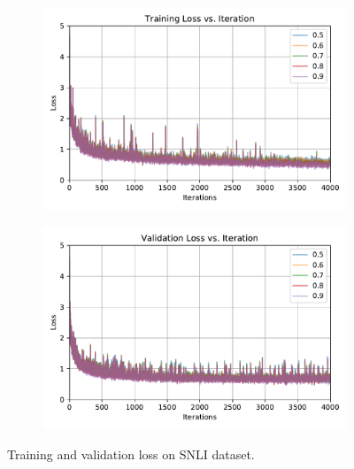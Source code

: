 \documentclass{article}
\begin{document}
\begin{figure}
\centering
\begin{subfigure}{.5\textwidth}
  \centering
  \includegraphics[scale=0.45]{train_loss}
  \label{fig:train_loss}
\end{subfigure}%
\begin{subfigure}{.5\textwidth}
  \centering
  \includegraphics[scale=0.45]{dev_loss}
  \label{fig:dev_loss}
\end{subfigure}
\caption{Training and validation loss on SNLI dataset.}
\label{fig:loss}
\end{figure}
\end{document}
